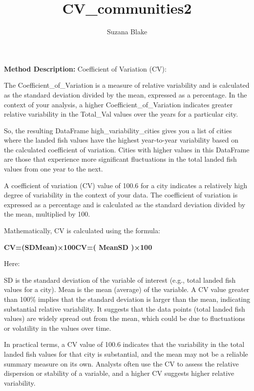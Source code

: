 \documentclass[
  letterpaper,
  DIV=11,
  numbers=noendperiod]{scrartcl}
\title{CV\_communities2}
\author{Suzana Blake}
\date{}
\begin{document}
\maketitle
\ifdefined\Shaded\renewenvironment{Shaded}{\begin{tcolorbox}[enhanced, borderline west={3pt}{0pt}{shadecolor}, boxrule=0pt, breakable, interior hidden, frame hidden, sharp corners]}{\end{tcolorbox}}\fi

\textbf{Method Description:} Coefficient of Variation (CV):

The Coefficient\_of\_Variation is a measure of relative variability and
is calculated as the standard deviation divided by the mean, expressed
as a percentage. In the context of your analysis, a higher
Coefficient\_of\_Variation indicates greater relative variability in the
Total\_Val values over the years for a particular city.

So, the resulting DataFrame high\_variability\_cities gives you a list
of cities where the landed fish values have the highest year-to-year
variability based on the calculated coefficient of variation. Cities
with higher values in this DataFrame are those that experience more
significant fluctuations in the total landed fish values from one year
to the next.

A coefficient of variation (CV) value of 100.6 for a city indicates a
relatively high degree of variability in the context of your data. The
coefficient of variation is expressed as a percentage and is calculated
as the standard deviation divided by the mean, multiplied by 100.

Mathematically, CV is calculated using the formula:

\textbf{CV=(SDMean)×100CV=( MeanSD\hspace{0pt} )×100}

Here:

SD is the standard deviation of the variable of interest (e.g., total
landed fish values for a city). Mean is the mean (average) of the
variable. A CV value greater than 100\% implies that the standard
deviation is larger than the mean, indicating substantial relative
variability. It suggests that the data points (total landed fish values)
are widely spread out from the mean, which could be due to fluctuations
or volatility in the values over time.

In practical terms, a CV value of 100.6 indicates that the variability
in the total landed fish values for that city is substantial, and the
mean may not be a reliable summary measure on its own. Analysts often
use the CV to assess the relative dispersion or stability of a variable,
and a higher CV suggests higher relative variability.
\end{document}
